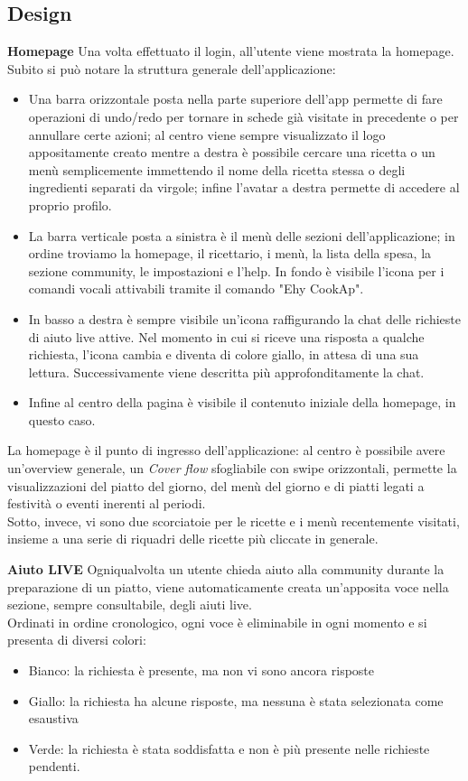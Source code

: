 
\subsection{Design}
\textbf{Homepage}
Una volta effettuato il login, all'utente viene mostrata la homepage.\\
Subito si può notare la struttura generale dell'applicazione:
\begin{itemize}
\item Una barra orizzontale posta nella parte superiore dell'app permette di fare operazioni di undo/redo per tornare in schede già visitate in precedente o per annullare certe azioni; al centro viene sempre visualizzato il logo appositamente creato mentre a destra è possibile cercare una ricetta o un menù semplicemente immettendo il nome della ricetta stessa o degli ingredienti separati da virgole; infine l'avatar a destra permette di accedere al proprio profilo.
\item La barra verticale posta a sinistra è il menù delle sezioni dell'applicazione; in ordine troviamo la homepage, il ricettario, i menù, la lista della spesa, la sezione community, le impostazioni e l'help. In fondo è visibile l'icona per i comandi vocali attivabili tramite il comando "Ehy CookAp".
\item In basso a destra è sempre visibile un'icona raffigurando la chat delle richieste di aiuto live attive. Nel momento in cui si riceve una risposta a qualche richiesta, l'icona cambia e diventa di colore giallo, in attesa di una sua lettura. Successivamente viene descritta più approfonditamente la chat.
\item Infine al centro della pagina è visibile il contenuto iniziale della homepage, in questo caso.
\end{itemize}
La homepage è il punto di ingresso dell'applicazione: al centro è possibile avere un'overview generale, un \textit{Cover flow} sfogliabile con swipe orizzontali, permette la visualizzazioni del piatto del giorno, del menù del giorno e di piatti legati a festività o eventi inerenti al periodi.\\
Sotto, invece, vi sono due scorciatoie per le ricette e i menù recentemente visitati, insieme a una serie di riquadri delle ricette più cliccate in generale.

\textbf{Aiuto LIVE}
Ogniqualvolta un utente chieda aiuto alla community durante la preparazione di un piatto, viene automaticamente creata un'apposita voce nella sezione, sempre consultabile, degli aiuti live.\\
Ordinati in ordine cronologico, ogni voce è eliminabile in ogni momento e si presenta di diversi colori:
\begin{itemize}
\item Bianco: la richiesta è presente, ma non vi sono ancora risposte
\item Giallo: la richiesta ha alcune risposte, ma nessuna è stata selezionata come esaustiva
\item Verde: la richiesta è stata soddisfatta e non è più presente nelle richieste pendenti.
\end{itemize}

